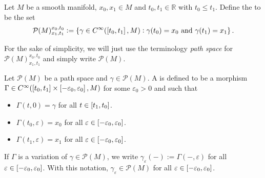 \begin{definition}
	\label{def:path_space}
	Let $M$ be a smooth manifold, $x_0,x_1 \in M$ and $t_0, t_1 \in \mathbb{R}$ with $t_0 \leq t_1$. Define the  to be the set
	\begin{equation}
		\label{eq:path_space}
		\mathcal{P}(M)^{x_0,t_0}_{x_1,t_1} := \cbr[0]{\gamma \in C^\infty(\intcc[0]{t_0,t_1},M) : \gamma(t_0) = x_0 \text{ and } \gamma(t_1) = x_1}.
	\end{equation}
\end{definition}

\begin{remark}
	For the sake of simplicity, we will just use the terminology \emph{path space} for $\mathcal{P}(M)^{x_0,t_0}_{x_1,t_1}$ and simply write $\mathcal{P}(M)$.
\end{remark}

\begin{definition}[Variation]
	\label{def:variation}
	Let $\mathcal{P}(M)$ be a path space and $\gamma \in \mathcal{P}(M)$. A  is defined to be a morphism $\Gamma \in C^\infty(\intcc[0]{t_0,t_1} \times \intcc[0]{-\varepsilon_0,\varepsilon_0},M)$ for some $\varepsilon_0 > 0$ and such that
	\begin{itemize}[wide=0pt]
		\item $\Gamma(t,0) = \gamma$ for all $t \in \intcc[0]{t_1,t_0}$.
		\item $\Gamma(t_0,\varepsilon) = x_0$ for all $\varepsilon \in \intcc[0]{-\varepsilon_0,\varepsilon_0}$.
		\item $\Gamma(t_1,\varepsilon) = x_1$ for all $\varepsilon \in \intcc[0]{-\varepsilon_0,\varepsilon_0}$.
	\end{itemize}
\end{definition}

\begin{remark}
	If $\Gamma$ is a variation of $\gamma \in \mathcal{P}(M)$, we write $\gamma_\varepsilon(-) := \Gamma(-,\varepsilon)$ for all $\varepsilon \in \intcc[0]{-\varepsilon_0,\varepsilon_0}$. With this notation, $\gamma_\varepsilon \in \mathcal{P}(M)$ for all $\varepsilon \in \intcc[0]{-\varepsilon_0,\varepsilon_0}$.
\end{remark}

